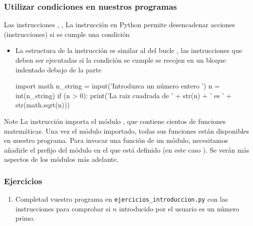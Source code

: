 \documentclass[handout,9pt]{beamer}
\begin{document}
\begin{frame}[fragile]
    \frametitle{Utilizar condiciones en nuestros programas}
    \begin{block}{Las instrucciones , ,
        }
    La instrucción  en Python permite desencadenar acciones
    (instrucciones) si se cumple una condición
  \end{block}
  \pause
  \begin{itemize}
  \item   La estructura de la instrucción   es similar al del
    bucle , las instrucciones que deben ser ejecutadas si la
    condición se cumple se recojen en un bloque indentado debajo de la
    parte 
    {\scriptsize
    \begin{pyverbatim}
import math
n_string = input('Introduzca un número entero ')
n = int(n_string)
if (n > 0):
    print('La raiz cuadrada de  ' + str(n) + ' es ' + str(math.sqrt(n)))
  \end{pyverbatim}
}
\end{itemize}
\pause
\begin{block}{Note}
  La instrucción  importa el módulo , que
  contiene cientos de funciones matemáticas. Una vez el módulo
  importado, todas sus funciones están disponibles en nuestro
  programa. Para invocar una función de un  módulo,
  necesitamos añadirle el prefijo del módulo en el que está definido
  (en este caso ). Se verán más aspectos de los módulos más
  adelante.
\end{block}
\end{frame}
\begin{frame}
  \frametitle{Ejercicios}
  \begin{enumerate}
  \item Completad vuestro programa en {\tt ejercicios\_introduccion.py}
    con las  instrucciones para comprobar si $n$ introducido por el usuario es un
    número primo.
  \end{enumerate}  
\end{frame}
\end{document}
